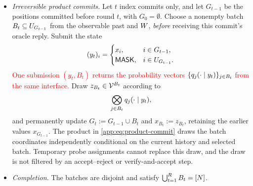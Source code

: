 \begin{definition}[\textcolor{red}{Admissible algorithms}]
\begin{itemize}
\item \emph{Irreversible product commits.}
Let $t$ index commits only, and let $G_{t-1}$ be the positions committed
before round $t$, with $G_0=\emptyset$.
Choose a nonempty batch $B_t\subseteq\ResidualPositionsAt{G_{t-1}}$
from the observable past and $\ControllerSeed$, \emph{before} receiving
this commit's oracle reply. Submit the state
\begin{equation}
 (y_t)_i=
 \begin{cases}
  x_i, & i\in G_{t-1},\\
  \MASK, & i\in\ResidualPositionsAt{G_{t-1}}.
 \end{cases}
 \label{app:eq:commit-state}
\end{equation}
\textcolor{red}{One submission $(y_t,B_t)$ returns the probability vectors
$\{\OracleRow{y_t}{j}\}_{j\in B_t}$ from the same interface.}
Draw $z_{B_t}\in\Vocab^{B_t}$ according to
\begin{equation}
 \bigotimes_{j\in B_t}\OracleRow{y_t}{j},
 \label{app:eq:product-commit}
\end{equation}
and permanently update $G_t:=G_{t-1}\cup B_t$ and $x_{B_t}:=z_{B_t}$,
retaining the earlier values $x_{G_{t-1}}$.
The product in \eqref{app:eq:product-commit} draws the batch coordinates
independently conditional on the current history and selected batch.
Temporary probe assignments cannot replace this draw, and the draw is
not filtered by an accept--reject or verify-and-accept step.

\item \emph{Completion.}
The batches are disjoint and satisfy
$\bigcup_{t=1}^{\CommitRounds}B_t=\PositionSet$.
\end{itemize}


\end{definition}
